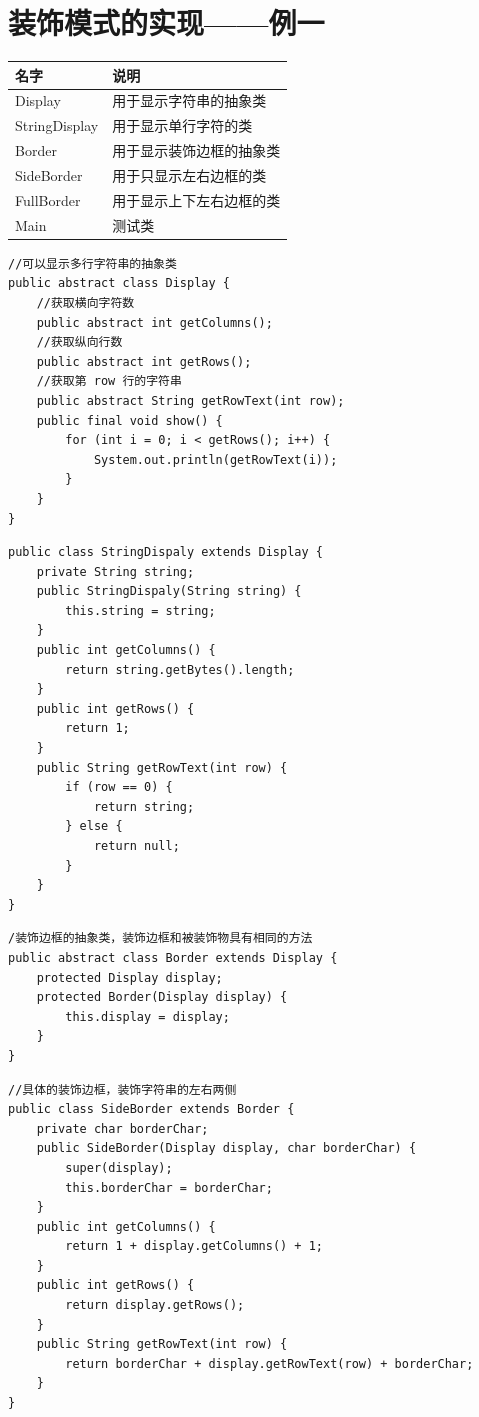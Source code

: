 \section{装饰模式的实现——例一}
\begin{table}[!h]
	\begin{tabular}{|l|l|}
		\hline
		名字&说明\\
		\hline
		Display&用于显示字符串的抽象类\\
		\hline
		StringDisplay&用于显示单行字符的类\\
		\hline
		Border&用于显示装饰边框的抽象类\\
		\hline
		SideBorder&用于只显示左右边框的类\\
		\hline
		FullBorder&用于显示上下左右边框的类\\
		\hline
		Main&测试类\\
		\hline
	\end{tabular}
\end{table}
\begin{lstlisting}
//可以显示多行字符串的抽象类
public abstract class Display {
	//获取横向字符数
	public abstract int getColumns();
	//获取纵向行数
	public abstract int getRows();
	//获取第 row 行的字符串
	public abstract String getRowText(int row);
	public final void show() {
		for (int i = 0; i < getRows(); i++) {
			System.out.println(getRowText(i));
		}
	}
}
\end{lstlisting}
\begin{lstlisting}
public class StringDispaly extends Display {
	private String string;
	public StringDispaly(String string) {
		this.string = string;
	}
	public int getColumns() {
		return string.getBytes().length;
	}
	public int getRows() {
		return 1;
	}
	public String getRowText(int row) {
		if (row == 0) {
			return string;
		} else {
			return null;
		}
	}
}
\end{lstlisting}
\begin{lstlisting}
/装饰边框的抽象类，装饰边框和被装饰物具有相同的方法
public abstract class Border extends Display {
	protected Display display;
	protected Border(Display display) {
		this.display = display;
	}
}
\end{lstlisting}
\begin{lstlisting}
//具体的装饰边框，装饰字符串的左右两侧
public class SideBorder extends Border {
	private char borderChar;
	public SideBorder(Display display, char borderChar) {
		super(display);
		this.borderChar = borderChar;
	}
	public int getColumns() {
		return 1 + display.getColumns() + 1;
	}
	public int getRows() {
		return display.getRows();
	}
	public String getRowText(int row) {
		return borderChar + display.getRowText(row) + borderChar;
	}
}
\end{lstlisting}
